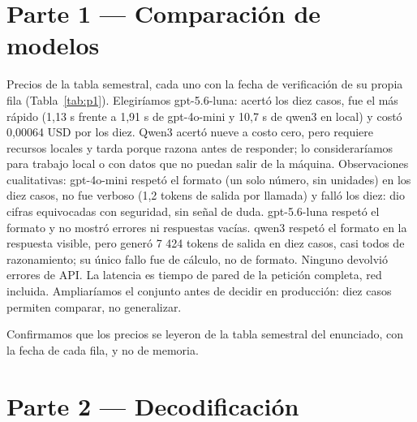 \documentclass[runningheads]{llncs}
\begin{document}
\section{Parte 1 --- Comparación de modelos}
Precios de la tabla semestral, cada uno con la fecha de verificación de su propia fila (Tabla~\ref{tab:p1}).
Elegiríamos gpt-5.6-luna: acertó los diez casos, fue el más rápido (1,13 s
frente a 1,91 s de gpt-4o-mini y 10,7 s de qwen3 en local) y costó 0,00064 USD
por los diez. Qwen3 acertó nueve a costo cero, pero requiere recursos locales y tarda porque
razona antes de responder; lo consideraríamos para trabajo local o con datos
que no puedan salir de la máquina. Observaciones cualitativas: gpt-4o-mini
respetó el formato (un solo número, sin unidades) en los diez casos, no fue
verboso (1,2 tokens de salida por llamada) y falló los diez: dio cifras
equivocadas con seguridad, sin señal de duda. gpt-5.6-luna respetó el formato
y no mostró errores ni respuestas vacías. qwen3 respetó el formato en la
respuesta visible, pero generó 7 424 tokens de salida en diez casos, casi todos
de razonamiento; su único fallo fue de cálculo, no de formato. Ninguno devolvió
errores de API. La latencia es tiempo de pared de la petición completa, red
incluida. Ampliaríamos el conjunto antes de decidir en producción: diez casos
permiten comparar, no generalizar.

Confirmamos que los precios se leyeron de la tabla semestral del enunciado,
con la fecha de cada fila, y no de memoria.

\section{Parte 2 --- Decodificación}
\end{document}
